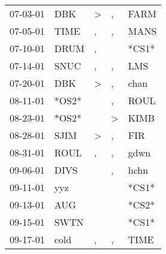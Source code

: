 \begin{supertabular}{p{0.07\textwidth}p{0.06\textwidth}p{0.02\textwidth}p{0.02\textwidth}p{0.06\textwidth}}
          07-03-01\textsuperscript{} &            DBK\textsuperscript{} &     \textgreater &                , &           FARM\textsuperscript{} \\
          07-05-01\textsuperscript{} &           TIME\textsuperscript{} &                , &                , &           MANS\textsuperscript{} \\
          07-10-01\textsuperscript{} &           DRUM\textsuperscript{} &                , &                  &                            *CS1* \\
          07-14-01\textsuperscript{} &           SNUC\textsuperscript{} &                , &                , &            LMS\textsuperscript{} \\
          07-20-01\textsuperscript{} &            DBK\textsuperscript{} &     \textgreater &                , &           chan\textsuperscript{} \\
          08-11-01\textsuperscript{} &                            *OS2* &                  &                , &           ROUL\textsuperscript{} \\
          08-23-01\textsuperscript{} &                            *OS2* &                  &     \textgreater &           KIMB\textsuperscript{} \\
          08-28-01\textsuperscript{} &           SJIM\textsuperscript{} &     \textgreater &                , &            FIR\textsuperscript{} \\
          08-31-01\textsuperscript{} &           ROUL\textsuperscript{} &                , &                , &           gdwn\textsuperscript{} \\
          09-06-01\textsuperscript{} &           DIVS\textsuperscript{} &                  &                , &           hchn\textsuperscript{} \\
          09-11-01\textsuperscript{} &            yyz\textsuperscript{} &                  &                  &                            *CS1* \\
          09-13-01\textsuperscript{} &            AUG\textsuperscript{} &                  &                  &                            *CS2* \\
          09-15-01\textsuperscript{} &           SWTN\textsuperscript{} &                  &                  &                            *CS1* \\
          09-17-01\textsuperscript{} &           cold\textsuperscript{} &                , &                , &           TIME\textsuperscript{} \\

\end{supertabular}
